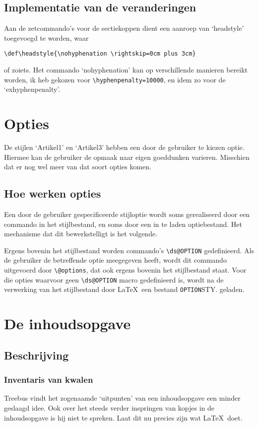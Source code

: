 \documentclass[a4paper]{artikel1} %
\begin{document}
\subsection{Implementatie van de veranderingen}
Aan de zetcommando's voor de sectiekoppen dient een aanroep van
`headstyle' toegevoegd te worden, waar
\begin{verbatim}
\def\headstyle{\nohyphenation \rightskip=0cm plus 3cm}
\end{verbatim}
of zoiets.  Het commando `nohyphenation' kan op verschillende manieren
bereikt worden, ik heb gekozen voor \verb+\hyphenpenalty=10000+, en
idem zo voor de `exhyphenpenalty'.
 
\section{Opties}
 
De stijlen `Artikel1' en `Artikel3' hebben een door de gebruiker te
kiezen optie.  Hiermee kan de gebruiker de opmaak naar eigen
goeddunken varieren.  Misschien dat er nog wel meer van dat soort
opties komen.
 
\subsection{Hoe werken opties}
Een door de gebruiker gespecificeerde stijloptie wordt soms
gerealiseerd door een commando in het stijlbestand, en soms door een
in te laden optiebestand.  Het mechanisme dat dit bewerkstelligt is
het volgende.
 
Ergens bovenin het stijlbestand worden commando's \verb.\ds@OPTION.
gedefinieerd. Als de gebruiker de betreffende optie meegegeven heeft,
wordt dit commando uitgevoerd door \verb.\@options., dat ook ergens
bovenin het stijlbestand staat.  Voor die opties waarvoor geen
\verb.\ds@OPTION. macro gedefinieerd is, wordt na de verwerking van
het stijlbestand door \LaTeX\ een bestand \verb.OPTION.STY. geladen.
 
\section{De inhoudsopgave}
 
\subsection{Beschrijving}
\subsubsection{Inventaris van kwalen}
Treebus vindt het zogenaamde `uitpunten' van een inhoudsopgave een
minder geslaagd idee. Ook over het steeds verder inspringen van kopjes
in de inhoudsopgave is hij niet te spreken. Laat dit nu precies zijn
wat \LaTeX\ doet.
 
\end{document}
